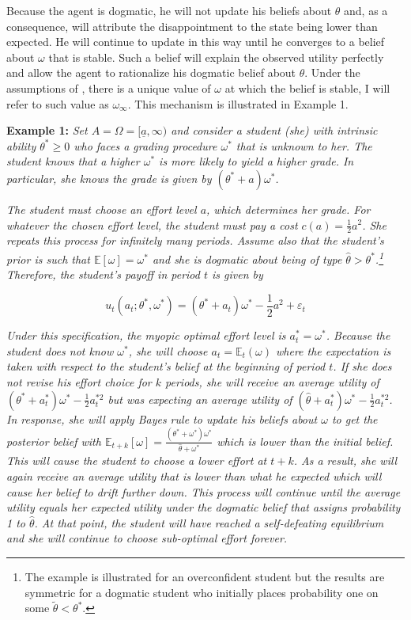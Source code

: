 \documentclass[
  12pt,
]{article}
\begin{document}
Because the agent is dogmatic, he will not update his beliefs about
\(\theta\) and, as a consequence, will attribute the disappointment to
the state being lower than expected. He will continue to update in this
way until he converges to a belief about \(\omega\) that is stable. Such
a belief will explain the observed utility perfectly and allow the agent
to rationalize his dogmatic belief about \(\theta\). Under the
assumptions of \citet{Heidhues2018}, there is a unique value of
\(\omega\) at which the belief is stable, I will refer to such value as
\(\omega_\infty\). This mechanism is illustrated in Example 1.

\textbf{Example 1: } \emph{Set \(A = \Omega=[\underline{a}, \infty)\)
and consider a student (she) with intrinsic ability \(\theta^*\geq 0\)
who faces a grading procedure \(\omega^*\) that is unknown to her. The
student knows that a higher \(\omega^*\) is more likely to yield a
higher grade. In particular, she knows the grade is given by
\((\theta^*+a)\omega^*\).}

\emph{The student must choose an effort level \(a\), which determines
her grade. For whatever the chosen effort level, the student must pay a
cost \(c(a) = \frac{1}{2}a^2\). She repeats this process for infinitely
many periods. Assume also that the student's prior is such that
\(\mathbb{E}[\omega]= \omega^*\) and she is dogmatic about being of type
\(\hat{\theta}>\theta^*\).\footnote{The example is illustrated for an overconfident student but the results are symmetric for a dogmatic student who initially places probability one on some $\tilde{\theta}<\theta^*$.}
Therefore, the student's payoff in period \(t\) is given by }

\begin{equation}
u_t(a_t; \theta^*, \omega^*) = (\theta^*+a_t)\omega^* - \frac{1}{2}a^2 + \varepsilon_t
\end{equation}

\emph{Under this specification, the myopic optimal effort level is
\(a_t^* = \omega^*\). Because the student does not know \(\omega^*\),
she will choose \(a_t = \mathbb{E}_t(\omega)\) where the expectation is
taken with respect to the student's belief at the beginning of period
\(t\). If she does not revise his effort choice for \(k\) periods, she
will receive an average utility of
\((\theta^*+a_t^*)\omega^* - \frac{1}{2}a_t^{*2}\) but was expecting an
average utility of
\((\hat{\theta}+a_t^*)\omega^* - \frac{1}{2}a_t^{*2}\). In response, she
will apply Bayes rule to update his beliefs about \(\omega\) to get the
posterior belief with
\(\mathbb{E}_{t+k}[\omega] = \frac{(\theta^{*} + \omega^{*})\omega^{*}}{\hat{\theta} + \omega^{*}}\)
which is lower than the initial belief. This will cause the student to
choose a lower effort at \(t+k\). As a result, she will again receive an
average utility that is lower than what he expected which will cause her
belief to drift further down. This process will continue until the
average utility equals her expected utility under the dogmatic belief
that assigns probability 1 to \(\hat{\theta}\). At that point, the
student will have reached a self-defeating equilibrium and she will
continue to choose sub-optimal effort forever.}
\end{document}

